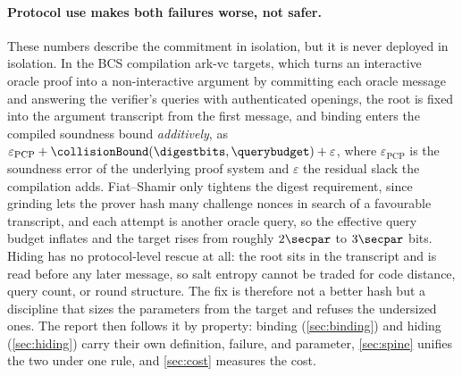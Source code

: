 \paragraph{Protocol use makes both failures worse, not safer.}
These numbers describe the commitment in isolation, but it is never deployed in
isolation.  In the BCS compilation \textsf{ark-vc} targets, which turns an
interactive oracle proof into a non-interactive argument by committing each
oracle message and answering the verifier's queries with authenticated openings,
the root is fixed into the argument transcript from the first message, and
binding enters the compiled soundness bound \emph{additively}, as
$\varepsilon_{\mathrm{PCP}}+\collisionBound(\digestbits,\querybudget)+\varepsilon$,
where $\varepsilon_{\mathrm{PCP}}$ is the soundness error of the underlying proof
system and $\varepsilon$ the residual slack the compilation adds.
Fiat--Shamir only tightens the digest requirement, since grinding lets the prover
hash many challenge nonces in search of a favourable transcript, and each attempt
is another oracle query, so the effective query budget inflates and the target
rises from roughly $2\secpar$ to $3\secpar$ bits.  Hiding has no protocol-level
rescue at all: the root sits in the transcript and is read before any later
message, so salt entropy cannot be traded for code distance, query count, or
round structure.  The fix is therefore not a better hash but a discipline that
sizes the parameters from the target and refuses the undersized ones.  The report
then follows it by property: binding (\cref{sec:binding}) and hiding
(\cref{sec:hiding}) carry their own definition, failure, and parameter,
\cref{sec:spine} unifies the two under one rule, and \cref{sec:cost} measures the
cost.
